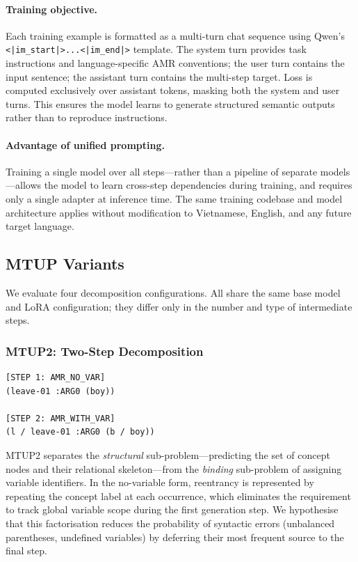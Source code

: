 \paragraph{Training objective.}
Each training example is formatted as a multi-turn chat sequence using
Qwen's \texttt{<|im\_start|>...<|im\_end|>} template. The system turn provides
task instructions and language-specific AMR conventions; the user turn contains
the input sentence; the assistant turn contains the multi-step target. Loss is
computed exclusively over assistant tokens, masking both the system and user
turns. This ensures the model learns to generate structured semantic outputs
rather than to reproduce instructions.

\paragraph{Advantage of unified prompting.}
Training a single model over all steps---rather than a pipeline of separate
models---allows the model to learn cross-step dependencies during training, and
requires only a single adapter at inference time. The same training codebase
and model architecture applies without modification to Vietnamese, English, and
any future target language.

\subsection{MTUP Variants}
\label{sec:variants}

We evaluate four decomposition configurations. All share the same base model
and LoRA configuration; they differ only in the number and type of intermediate
steps.

\subsubsection{MTUP2: Two-Step Decomposition}

\begin{lstlisting}[style=amrstyle, basicstyle=\scriptsize\ttfamily]
[STEP 1: AMR_NO_VAR]
(leave-01 :ARG0 (boy))

[STEP 2: AMR_WITH_VAR]
(l / leave-01 :ARG0 (b / boy))
\end{lstlisting}

MTUP2 separates the \emph{structural} sub-problem---predicting the set of
concept nodes and their relational skeleton---from the \emph{binding}
sub-problem of assigning variable identifiers. In the no-variable form,
reentrancy is represented by repeating the concept label at each occurrence,
which eliminates the requirement to track global variable scope during the
first generation step. We hypothesise that this factorisation reduces the
probability of syntactic errors (unbalanced parentheses, undefined variables)
by deferring their most frequent source to the final step.

